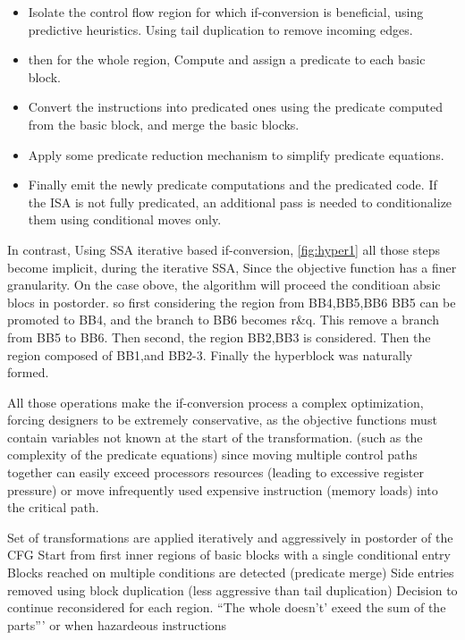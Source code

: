 \begin{itemize}
\item Isolate the control flow region for which if-conversion is beneficial, using predictive heuristics. Using tail duplication to remove incoming edges. 
\item then for the whole region, Compute and assign a predicate to each basic block.
\item Convert the instructions into predicated ones using the predicate computed from the basic block, and merge the basic blocks.
\item Apply some predicate reduction mechanism to simplify predicate equations.
\item Finally emit the newly predicate computations and the predicated code. If the ISA is not fully predicated, an additional pass is needed to conditionalize them using conditional moves only.
\end{itemize}

In contrast, Using SSA iterative based if-conversion, \ref{fig:hyper1} all those steps become implicit, during the iterative SSA, Since the objective function has a finer granularity. On the case obove, the algorithm will proceed the conditioan absic blocs in postorder.
so first considering the region from {BB4,BB5,BB6} BB5 can be promoted to BB4, and the branch to BB6 becomes r\&q. This remove a branch from BB5 to BB6.
Then second, the region {BB2,BB3 is considered}. Then the region composed of {BB1,and BB2-3}. Finally the hyperblock was naturally formed.

All those operations make the if-conversion process a complex optimization, forcing designers to be extremely conservative, as the objective functions must contain variables not known at the start of the transformation. (such as the complexity of the predicate equations) since moving multiple control paths together can easily exceed processors resources (leading to excessive register pressure) or move infrequently used expensive instruction (memory loads) into the critical path. 

Set of transformations are applied iteratively and aggressively in postorder of the CFG
Start from first inner regions of basic blocks with a single conditional entry
Blocks reached on multiple conditions are detected (predicate merge)
Side entries removed using block duplication (less aggressive than tail duplication)
Decision to continue reconsidered for each region. ``The whole doesn't' exeed the sum of the parts''' or when hazardeous instructions

